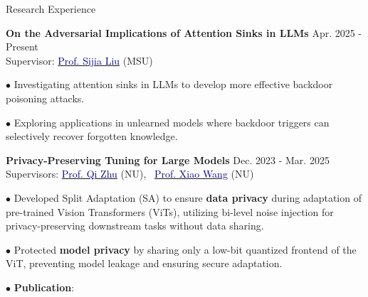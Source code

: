 
\begin{rSection}{Research Experience}
    
     \small{{\bf On the Adversarial Implications of Attention Sinks in LLMs}  \hfill Apr. 2025 - Present
    \\ Supervisor: \href{https://lsjxjtu.github.io/index.html}{\textcolor{darkblue}{Prof. Sijia Liu}} (MSU)
\vspace{-1.5mm}
    
    \quad $\bullet$ Investigating attention sinks in LLMs to develop more effective backdoor poisoning attacks.
\vspace{-2mm}
    
    \quad $\bullet$ Exploring applications in unlearned models where backdoor triggers can selectively recover forgotten knowledge.

    }
    
    \small{{\bf Privacy-Preserving Tuning for Large Models}  \hfill Dec. 2023 - Mar. 2025
    \\  Supervisors: \href{https://scholar.google.com/citations?user=TN09YMcAAAAJ&hl=en}{\textcolor{darkblue}{Prof. Qi Zhu}} (NU), \ \href{https://wangxiao1254.github.io/}{\textcolor{darkblue}{Prof. Xiao Wang}} (NU)
\vspace{-1.5mm}
    
    
    \quad $\bullet$ Developed Split Adaptation (SA) to ensure \textbf{data privacy }during adaptation of pre-trained Vision Transformers
(ViTs), utilizing bi-level noise injection for privacy-preserving downstream tasks without data sharing.
\vspace{-2mm}

    \quad $\bullet$ Protected \textbf{model privacy} by sharing only a low-bit quantized frontend of the ViT, preventing model leakage and
ensuring secure adaptation.
\vspace{-2mm}

    \quad $\bullet$ \textbf{Publication}: 


}
    \end{rSection}